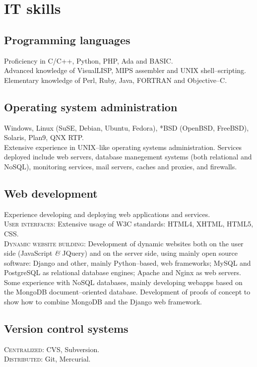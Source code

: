 \documentclass[11pt, a4paper]{article}
\newcommand{\amper}
           {{\fontspec[Scale=.95]
                      {Adobe Caslon Pro}\selectfont\itshape\&}}
\begin{document}
\section*{IT skills} %
\subsection*{Programming languages}
\noindent
	Proficiency in C/C++, Python, PHP, Ada and BASIC.\\
	Advanced knowledge of VisualLISP, MIPS assembler and UNIX shell--scripting.\\
	Elementary knowledge of Perl, Ruby, Java, FORTRAN and Objective--C.
\subsection*{Operating system administration}
\noindent
	Windows, Linux (SuSE, Debian, Ubuntu, Fedora), *BSD (OpenBSD, FreeBSD), Solaris, Plan9, QNX RTP.\\
	Extensive experience in UNIX--like operating systems administration. Services deployed include web servers, database manegement systems (both relational and NoSQL), monitoring services, mail servers, caches and proxies, and firewalls.
\subsection*{Web development}
\noindent
	Experience developing and deploying web applications and services.\\
	\textsc{User interfaces}: Extensive usage of W3C standards: HTML4, XHTML, HTML5, CSS.\\
	\textsc{Dynamic website building}: Development of dynamic websites both on the user side (JavaScript \amper{} JQuery) and on the server side, using mainly open source software: Django and other, mainly Python--based, web frameworks; MySQL and PostgreSQL as relational database engines; Apache and Nginx as web servers.\\
	Some experience with NoSQL databases, mainly developing webapps based on the MongoDB document--oriented database. Development of proofs of concept to show how to combine MongoDB and the Django web framework.
\subsection*{Version control systems}
\noindent
	\textsc{Centralized}: CVS, Subversion.\\
	\textsc{Distributed}: Git, Mercurial.
\end{document}
